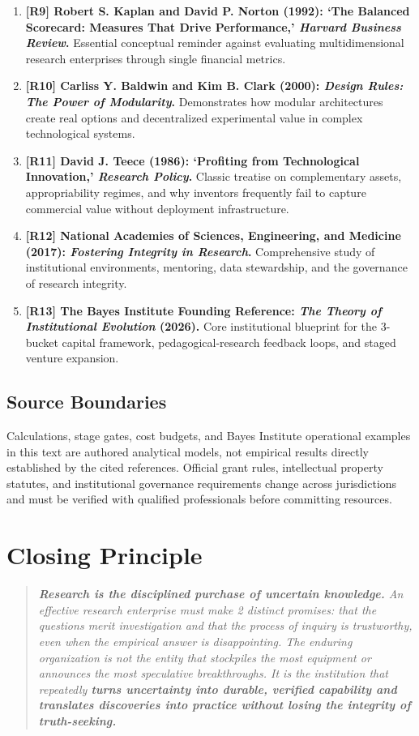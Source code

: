 \begin{enumerate}
    \item \textbf{[R9] Robert S. Kaplan and David P. Norton (1992): `The Balanced Scorecard: Measures That Drive Performance,' \textit{Harvard Business Review}.} Essential conceptual reminder against evaluating multidimensional research enterprises through single financial metrics.
    \item \textbf{[R10] Carliss Y. Baldwin and Kim B. Clark (2000): \textit{Design Rules: The Power of Modularity}.} Demonstrates how modular architectures create real options and decentralized experimental value in complex technological systems.
    \item \textbf{[R11] David J. Teece (1986): `Profiting from Technological Innovation,' \textit{Research Policy}.} Classic treatise on complementary assets, appropriability regimes, and why inventors frequently fail to capture commercial value without deployment infrastructure.
    \item \textbf{[R12] National Academies of Sciences, Engineering, and Medicine (2017): \textit{Fostering Integrity in Research}.} Comprehensive study of institutional environments, mentoring, data stewardship, and the governance of research integrity.
    \item \textbf{[R13] The Bayes Institute Founding Reference: \textit{The Theory of Institutional Evolution} (2026).} Core institutional blueprint for the 3-bucket capital framework, pedagogical-research feedback loops, and staged venture expansion.
\end{enumerate}

\subsection*{Source Boundaries}

Calculations, stage gates, cost budgets, and Bayes Institute operational examples in this text are authored analytical models, not empirical results directly established by the cited references. Official grant rules, intellectual property statutes, and institutional governance requirements change across jurisdictions and must be verified with qualified professionals before committing resources.

\section*{Closing Principle}

\begin{quote}
\itshape
\textbf{Research is the disciplined purchase of uncertain knowledge.} An effective research enterprise must make 2 distinct promises: that the questions merit investigation and that the process of inquiry is trustworthy, even when the empirical answer is disappointing. The enduring organization is not the entity that stockpiles the most equipment or announces the most speculative breakthroughs. It is the institution that repeatedly \textbf{turns uncertainty into durable, verified capability and translates discoveries into practice without losing the integrity of truth-seeking.}
\end{quote}

